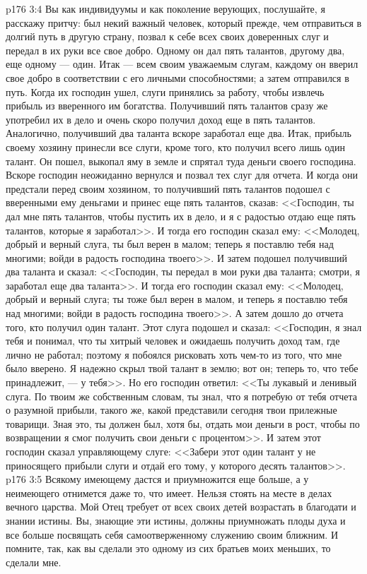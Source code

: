 \vs p176 3:4 Вы как индивидуумы и как поколение верующих, послушайте, я расскажу притчу: был некий важный человек, который прежде, чем отправиться в долгий путь в другую страну, позвал к себе всех своих доверенных слуг и передал в их руки все свое добро. Одному он дал пять талантов, другому два, еще одному --- один. Итак --- всем своим уважаемым слугам, каждому он вверил свое добро в соответствии с его личными способностями; а затем отправился в путь. Когда их господин ушел, слуги принялись за работу, чтобы извлечь прибыль из вверенного им богатства. Получивший пять талантов сразу же употребил их в дело и очень скоро получил доход еще в пять талантов. Аналогично, получивший два таланта вскоре заработал еще два. Итак, прибыль своему хозяину принесли все слуги, кроме того, кто получил всего лишь один талант. Он пошел, выкопал яму в земле и спрятал туда деньги своего господина. Вскоре господин неожиданно вернулся и позвал тех слуг для отчета. И когда они предстали перед своим хозяином, то получивший пять талантов подошел с вверенными ему деньгами и принес еще пять талантов, сказав: <<Господин, ты дал мне пять талантов, чтобы пустить их в дело, и я с радостью отдаю еще пять талантов, которые я заработал>>. И тогда его господин сказал ему: <<Молодец, добрый и верный слуга, ты был верен в малом; теперь я поставлю тебя над многими; войди в радость господина твоего>>. И затем подошел получивший два таланта и сказал: <<Господин, ты передал в мои руки два таланта; смотри, я заработал еще два таланта>>. И тогда его господин сказал ему: <<Молодец, добрый и верный слуга; ты тоже был верен в малом, и теперь я поставлю тебя над многими; войди в радость господина твоего>>. А затем дошло до отчета того, кто получил один талант. Этот слуга подошел и сказал: <<Господин, я знал тебя и понимал, что ты хитрый человек и ожидаешь получить доход там, где лично не работал; поэтому я побоялся рисковать хоть чем\hyp{}то из того, что мне было вверено. Я надежно скрыл твой талант в землю; вот он; теперь то, что тебе принадлежит, --- у тебя>>. Но его господин ответил: <<Ты лукавый и ленивый слуга. По твоим же собственным словам, ты знал, что я потребую от тебя отчета о разумной прибыли, такого же, какой представили сегодня твои прилежные товарищи. Зная это, ты должен был, хотя бы, отдать мои деньги в рост, чтобы по возвращении я смог получить свои деньги с процентом>>. И затем этот господин сказал управляющему слуге: <<Забери этот один талант у не приносящего прибыли слуги и отдай его тому, у которого десять талантов>>.
\vs p176 3:5 Всякому имеющему дастся и приумножится еще больше, а у неимеющего отнимется даже то, что имеет. Нельзя стоять на месте в делах вечного царства. Мой Отец требует от всех своих детей возрастать в благодати и знании истины. Вы, знающие эти истины, должны приумножать плоды духа и все больше посвящать себя самоотверженному служению своим ближним. И помните, так, как вы сделали это одному из сих братьев моих меньших, то сделали мне.

